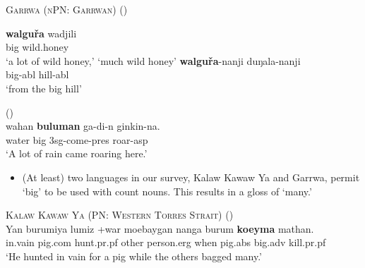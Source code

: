 \documentclass{article}
\begin{document}
\begin{exe}
\ex \textsc{Garrwa (nPN: Garrwan)} (\citealt{furby77})
\begin{xlist}
\ex \gll \textbf{walgu\v{r}a} wadjili \\
big wild.honey\\
\glt `a lot of wild honey,' `much wild honey' %
\ex \gll \textbf{walgu\v{r}a}-nanji duŋala-nanji\\
big-{\sc abl} hill-{\sc abl}\\
\glt `from the big hill' %
\end{xlist}
 (\citealt[67]{wilson06})\\
\gll wahan \textbf{buluman} ga-di-n   ginkin-na.\\
water   big  3{\sc sg}-come-{\sc pres} roar-{\sc asp}\\
\glt `A lot of rain came roaring here.'
\end{exe}

\begin{itemize}
\item (At least) two languages in our survey, Kalaw Kawaw Ya and Garrwa, permit `big'  to be used with count nouns. This results in a gloss of `many.' %
\end{itemize}

\begin{exe}
\ex \textsc{Kalaw Kawaw Ya (PN: Western Torres Strait)} (\citealt[141]{fo91})\\
\gll Yan burumiya lumiz +war moebaygan nanga burum        \textbf{koeyma}    mathan.\\
 in.vain pig.{\sc com} hunt.{\sc pr.pf} other person.{\sc erg} when   pig.{\sc abs}    big.{\sc adv}    kill.{\sc pr.pf}\\
\glt `He hunted in vain for a pig while the others bagged many.'

\end{exe}
\end{document}
